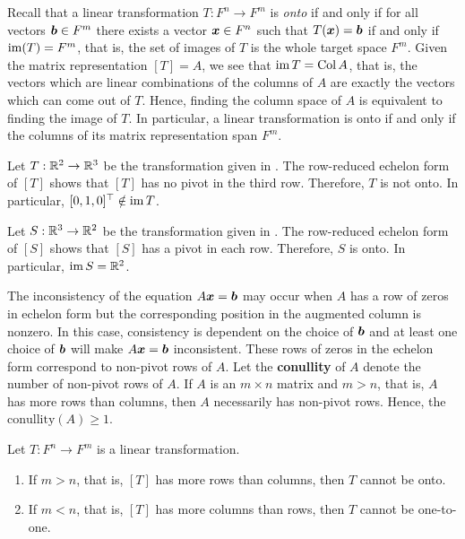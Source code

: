 Recall that a linear transformation $T: F^n\to F^m$ is \emph{onto} if and only if for all vectors $\boldsymbol b\in F^m$ there exists a vector $\boldsymbol x\in F^n$ such that $T(\boldsymbol x) = \boldsymbol b$ if and only if $\operatorname*{im}(T) = F^m$, that is, the set of images of $T$ is the whole target space $F^m$. Given the matrix representation $[T] = A$, we see that $\operatorname*{im}  T = \operatorname{Col} A$, that is, the vectors which are linear combinations of the columns of $A$ are exactly the vectors which can come out of $T$. Hence, finding the column space of $A$ is equivalent to finding the image of $T$. In particular, a linear transformation is onto if and only if the columns of its matrix representation span $F^m$.\\

\begin{Exam} Let $T : \mathbb{R}^2 \to \mathbb{R}^3$ be the transformation given in . The row-reduced echelon form of $[T]$ shows that $[T]$ has no pivot in the third row. Therefore, $T$ is not onto. In particular, $[0, 1, 0]^\top \notin \operatorname*{im} T$.
\end{Exam}\vs

\begin{Exam} Let $S : \mathbb{R}^3 \to \mathbb{R}^2$ be the transformation given in . The row-reduced echelon form of $[S]$ shows that $[S]$ has a pivot in each row. Therefore, $S$ is onto. In particular, $\operatorname*{im} S = \mathbb{R}^2$.
\end{Exam}\vs

The inconsistency of the equation $A\boldsymbol x=\boldsymbol b$ may occur when $A$ has a row of zeros in echelon form but the corresponding position in the augmented column is nonzero. In this case, consistency is dependent on the choice of $\boldsymbol b$ and at least one choice of $\boldsymbol b$ will make $A\boldsymbol x= \boldsymbol b$ inconsistent. These rows of zeros in the echelon form correspond to non-pivot rows of $A$. Let the \textbf{conullity} of $A$ denote the number of non-pivot rows of $A$.  If $A$ is an $m\times n$ matrix and $m>n$, that is, $A$ has more rows than columns, then $A$ necessarily has non-pivot rows. Hence, the $\text{conullity}(A) \ge 1$.\\

\begin{Prop} Let $T : F^n\to F^m$ is a linear transformation. 
\begin{enumerate}[!THM!]
\item If $m>n$, that is, $[T]$ has more rows than columns, then $T$ cannot be onto.
\item If $m<n$, that is, $[T]$ has more columns than rows, then $T$ cannot be one-to-one.
\end{enumerate}
\end{Prop}\vs


